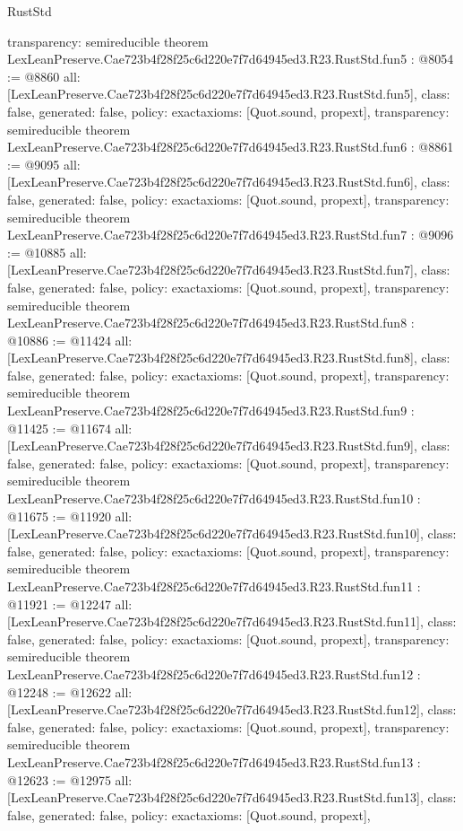 \begin{lexlean}{RustStd}
\begin{coremodule}
{  transparency: semireducible
}
theorem LexLeanPreserve.Cae723b4f28f25c6d220e7f7d64945ed3.R23.RustStd.fun5 : @8054 := @8860 {
  all: [LexLeanPreserve.Cae723b4f28f25c6d220e7f7d64945ed3.R23.RustStd.fun5],
  class: false,
  generated: false,
  policy: exact{axioms: [Quot.sound, propext]},
  transparency: semireducible
}
theorem LexLeanPreserve.Cae723b4f28f25c6d220e7f7d64945ed3.R23.RustStd.fun6 : @8861 := @9095 {
  all: [LexLeanPreserve.Cae723b4f28f25c6d220e7f7d64945ed3.R23.RustStd.fun6],
  class: false,
  generated: false,
  policy: exact{axioms: [Quot.sound, propext]},
  transparency: semireducible
}
theorem LexLeanPreserve.Cae723b4f28f25c6d220e7f7d64945ed3.R23.RustStd.fun7 : @9096 := @10885 {
  all: [LexLeanPreserve.Cae723b4f28f25c6d220e7f7d64945ed3.R23.RustStd.fun7],
  class: false,
  generated: false,
  policy: exact{axioms: [Quot.sound, propext]},
  transparency: semireducible
}
theorem LexLeanPreserve.Cae723b4f28f25c6d220e7f7d64945ed3.R23.RustStd.fun8 : @10886 := @11424 {
  all: [LexLeanPreserve.Cae723b4f28f25c6d220e7f7d64945ed3.R23.RustStd.fun8],
  class: false,
  generated: false,
  policy: exact{axioms: [Quot.sound, propext]},
  transparency: semireducible
}
theorem LexLeanPreserve.Cae723b4f28f25c6d220e7f7d64945ed3.R23.RustStd.fun9 : @11425 := @11674 {
  all: [LexLeanPreserve.Cae723b4f28f25c6d220e7f7d64945ed3.R23.RustStd.fun9],
  class: false,
  generated: false,
  policy: exact{axioms: [Quot.sound, propext]},
  transparency: semireducible
}
theorem LexLeanPreserve.Cae723b4f28f25c6d220e7f7d64945ed3.R23.RustStd.fun10 : @11675 := @11920 {
  all: [LexLeanPreserve.Cae723b4f28f25c6d220e7f7d64945ed3.R23.RustStd.fun10],
  class: false,
  generated: false,
  policy: exact{axioms: [Quot.sound, propext]},
  transparency: semireducible
}
theorem LexLeanPreserve.Cae723b4f28f25c6d220e7f7d64945ed3.R23.RustStd.fun11 : @11921 := @12247 {
  all: [LexLeanPreserve.Cae723b4f28f25c6d220e7f7d64945ed3.R23.RustStd.fun11],
  class: false,
  generated: false,
  policy: exact{axioms: [Quot.sound, propext]},
  transparency: semireducible
}
theorem LexLeanPreserve.Cae723b4f28f25c6d220e7f7d64945ed3.R23.RustStd.fun12 : @12248 := @12622 {
  all: [LexLeanPreserve.Cae723b4f28f25c6d220e7f7d64945ed3.R23.RustStd.fun12],
  class: false,
  generated: false,
  policy: exact{axioms: [Quot.sound, propext]},
  transparency: semireducible
}
theorem LexLeanPreserve.Cae723b4f28f25c6d220e7f7d64945ed3.R23.RustStd.fun13 : @12623 := @12975 {
  all: [LexLeanPreserve.Cae723b4f28f25c6d220e7f7d64945ed3.R23.RustStd.fun13],
  class: false,
  generated: false,
  policy: exact{axioms: [Quot.sound, propext]},
}
\end{coremodule}
\end{lexlean}
